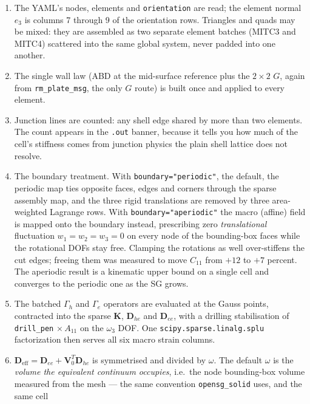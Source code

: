 \begin{enumerate}
\item The YAML's nodes, elements and \texttt{orientation} are read; the
      element normal $e_3$ is columns 7 through 9 of the orientation rows.
      Triangles and quads may be mixed: they are assembled as two separate
      element batches (MITC3 and MITC4) scattered into the same global
      system, never padded into one another.
\item The single wall law (ABD at the mid-surface reference plus the $2\times2$
      $G$, again from \texttt{rm\_plate\_msg}, the only $G$ route) is built
      once and applied to every element.
\item Junction lines are counted: any shell edge shared by more than two
      elements. The count appears in the \texttt{.out} banner, because it tells
      you how much of the cell's stiffness comes from junction physics the
      plain shell lattice does not resolve.
\item The boundary treatment. With \texttt{boundary="periodic"}, the default, the
      periodic map ties opposite faces, edges and corners through the sparse
      assembly map, and the three rigid translations are removed by three
      area-weighted Lagrange rows. With \texttt{boundary="aperiodic"} the macro
      (affine) field is mapped onto the boundary instead, prescribing zero
      \emph{translational} fluctuation $w_1=w_2=w_3=0$ on every node of the
      bounding-box faces while the rotational DOFs stay free. Clamping the
      rotations as well over-stiffens the cut edges; freeing them was measured
      to move $C_{11}$ from $+12$ to $+7$ percent. The aperiodic result is a
      kinematic upper bound on a single cell and converges to the periodic one
      as the SG grows.
\item The batched $\Gamma_h$ and $\Gamma_e$ operators are evaluated at the Gauss
      points, contracted into the sparse $\mathbf{K}$, $\mathbf{D}_{he}$ and
      $\mathbf{D}_{ee}$, with a drilling stabilisation of
      \texttt{drill\_pen} $\times\,A_{11}$ on the $\omega_3$ DOF. One
      \texttt{scipy.sparse.linalg.splu} factorization then serves all six macro
      strain columns.
\item $\mathbf{D}_{\mathrm{eff}} = \mathbf{D}_{ee} +
      \mathbf{V}_0^{T}\mathbf{D}_{he}$ is symmetrised and divided by $\omega$.
      The default $\omega$ is the \emph{volume the equivalent continuum
      occupies}, i.e.\ the node bounding-box volume measured from the mesh
      --- the same convention \texttt{opensg\_solid} uses, and the same cell

\end{enumerate}
